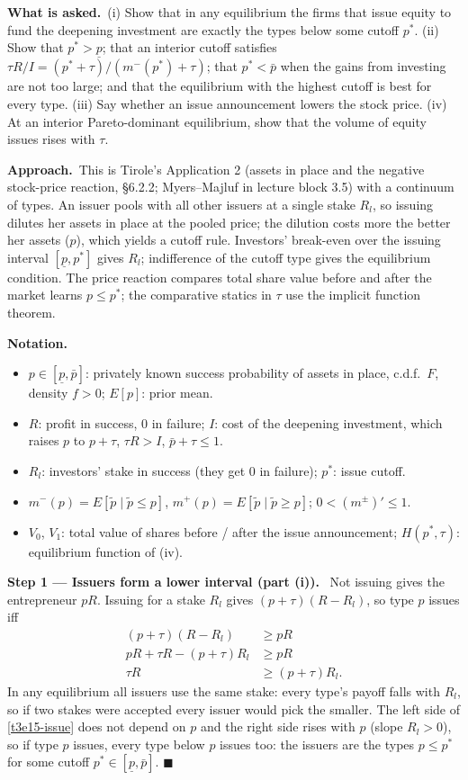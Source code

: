 \documentclass[11pt,a4paper]{article}
\newcommand{\notation}{\par\noindent\textbf{Notation.}}
\newcommand{\step}[2]{\par\medskip\noindent\textbf{Step #1 --- #2.}~}
\newcommand{\asked}{\par\medskip\noindent\textbf{What is asked.}~}
\newcommand{\approach}{\par\smallskip\noindent\textbf{Approach.}~}
\begin{document}
\asked (i) Show that in any equilibrium the firms that issue equity to fund the deepening investment are exactly the types below some cutoff $p^*$. (ii) Show that $p^*>\underline p$; that an interior cutoff satisfies $\tau R/I=(p^*+\tau)/(m^-(p^*)+\tau)$; that $p^*<\bar p$ when the gains from investing are not too large; and that the equilibrium with the highest cutoff is best for every type. (iii) Say whether an issue announcement lowers the stock price. (iv) At an interior Pareto-dominant equilibrium, show that the volume of equity issues rises with $\tau$.

\approach This is Tirole's Application 2 (assets in place and the negative stock-price reaction, \S6.2.2; Myers--Majluf in lecture block 3.5) with a continuum of types. An issuer pools with all other issuers at a single stake $R_l$, so issuing dilutes her assets in place at the pooled price; the dilution costs more the better her assets ($p$), which yields a cutoff rule. Investors' break-even over the issuing interval $[\underline p,p^*]$ gives $R_l$; indifference of the cutoff type gives the equilibrium condition. The price reaction compares total share value before and after the market learns $p\le p^*$; the comparative statics in $\tau$ use the implicit function theorem.

\notation
\begin{itemize}
  \item $p\in[\underline p,\bar p]$: privately known success probability of assets in place, c.d.f.\ $F$, density $f>0$; $E[p]$: prior mean.
  \item $R$: profit in success, 0 in failure; $I$: cost of the deepening investment, which raises $p$ to $p+\tau$, $\tau R>I$, $\bar p+\tau\le1$.
  \item $R_l$: investors' stake in success (they get 0 in failure); $p^*$: issue cutoff.
  \item $m^-(p)=E[\tilde p\mid\tilde p\le p]$, $m^+(p)=E[\tilde p\mid\tilde p\ge p]$; $0<(m^\pm)'\le1$.
  \item $V_0$, $V_1$: total value of shares before / after the issue announcement; $H(p^*,\tau)$: equilibrium function of (iv).
\end{itemize}

\step{1}{Issuers form a lower interval (part (i))} Not issuing gives the entrepreneur $pR$. Issuing for a
stake $R_l$ gives $(p+\tau)(R-R_l)$, so type $p$ issues iff
\begin{align}
  (p+\tau)(R-R_l) &\ge pR \nonumber\\
  pR+\tau R-(p+\tau)R_l &\ge pR \nonumber\\
  \tau R &\ge (p+\tau)R_l. \label{t3e15-issue}
\end{align}
In any equilibrium all issuers use the same stake: every type's payoff falls with $R_l$, so if two stakes
were accepted every issuer would pick the smaller. The left side of \eqref{t3e15-issue} does not depend on $p$ and the right side rises with $p$ (slope $R_l>0$),
so if type $p$ issues, every type below $p$ issues too: the issuers are the types $p\le p^*$ for some cutoff $p^*\in[\underline p,\bar p]$. $\blacksquare$
\end{document}
